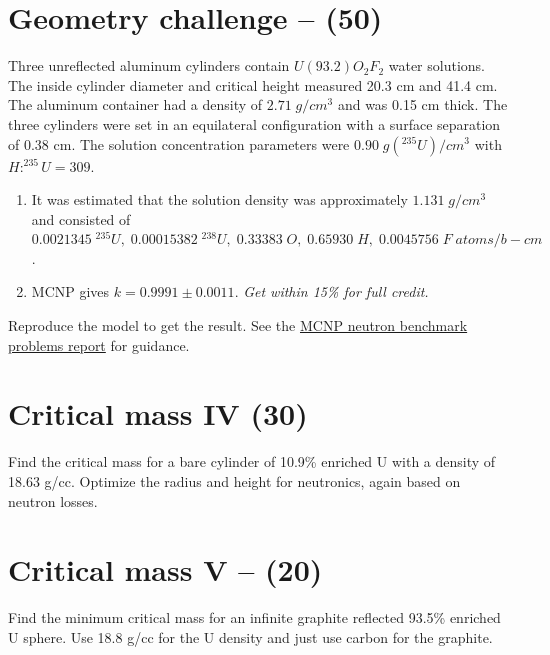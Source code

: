 \documentclass[11pt,a4paper]{article}
\begin{document}
\newpage

\section{Geometry challenge -- (50)}
Three unreflected aluminum cylinders contain $U(93.2)O_2F_2$ water solutions. The inside cylinder diameter and critical height measured 20.3 cm and 41.4 cm. The aluminum container had a density of $2.71 \; g/cm^3$ and was 0.15 cm thick. The three cylinders were set in an equilateral configuration with a surface separation of 0.38 cm. The solution concentration parameters were $0.90 \; g(^{235}U)/cm^3$ with $H:^{235}U = 309$.

\begin{enumerate}
    \item It was estimated that the solution density was approximately $1.131 \; g/cm^3$ and consisted of\\ $0.0021345\;^{235}U, \; 0.00015382\;^{238}U, \; 0.33383\;O, \; 0.65930\;H, \; 0.0045756\;F \; atoms/b-cm$.
    \item MCNP gives $k = 0.9991\pm0.0011$. \textit{Get within 15\% for full credit.}
\end{enumerate}    


Reproduce the model to get the result. See the \href{https://piazza.com/class_profile/get_resource/mcf5xaxnhxh5qs/mgqps3ida2r4d}{MCNP neutron benchmark problems report} for guidance.





\newpage

\section{Critical mass IV (30)}
Find the critical mass for a bare cylinder of 10.9\% enriched U with a density of 18.63 g/cc. Optimize the radius and height for neutronics, again based on neutron losses. 





\newpage

\section{Critical mass V -- (20)}
Find the minimum critical mass for an infinite graphite reflected 93.5\% enriched U sphere. Use 18.8 g/cc for the U density and just use carbon for the graphite.
\end{document}
